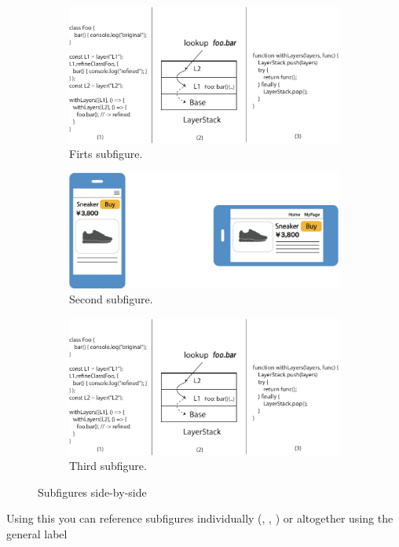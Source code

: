 \begin{figure}
\centering
\begin{subfigure}[b]{0.45\textwidth}
    \includegraphics[width=\textwidth]{figures/contextjs}
    \caption{Firts subfigure.}
    \label{fig:first}
\end{subfigure}
\hfill
\begin{subfigure}[b]{0.45\textwidth}
    \includegraphics[width=\textwidth]{figures/copex2}
    \caption{Second subfigure.}
    \label{fig:second}
\end{subfigure}
\hfill
\begin{subfigure}{0.4\textwidth}
    \includegraphics[width=\textwidth]{figures/contextjs}
    \caption{Third subfigure.}
    \label{fig:third}
\end{subfigure}
\caption{Subfigures side-by-side}
\label{fig:figures}
\end{figure}


Using this you can reference subfigures individually (\eg {}, , ) or altogether using the general label 

\endinput